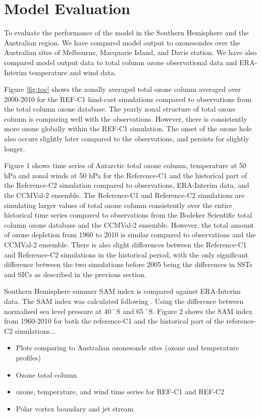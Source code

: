 \section{Model Evaluation}
To evaluate the performance of the model in the Southern Hemisphere and the Australian region. We have compared model output to ozonesondes over the Australian sites of Melbourne, Macquarie Island, and Davis station. We have also compared model output data to total column ozone observational data and ERA-Interim temperature and wind data. 

Figure \ref{fig:toc} shows the zonally averaged total ozone column averaged over 2000-2010 for the REF-C1 hind-cast simulations compared to observations from the total column ozone database. The yearly zonal structure of total ozone column is comparing well with the observations. However, there is consistently more ozone globally within the REF-C1 simulation. The onset of the ozone hole also occurs slightly later compared to the observations, and persists for slightly longer.

Figure 1 shows time series of Antarctic total ozone column, temperature at 50 hPa and zonal winds at 50 hPa for the Reference-C1 and the historical part of the Reference-C2 simulation compared to observations, ERA-Interim data, and the CCMVal-2 ensemble. The Reference-C1 and Reference-C2 simulations are simulating larger values of total ozone column consistently over the entire historical time series compared to observations from the Bodeker Scientific total column ozone database and the CCMVal-2 ensemble. However, the total amount of ozone depletion from 1960 to 2010 is similar compared to observations and the CCMVal-2 ensemble. There is also slight differences between the Reference-C1 and Reference-C2 simulations in the historical period, with the only significant difference between the two simulations before 2005 being the differences in SSTs and SICs as described in the previous section.

Southern Hemisphere summer SAM index is compared against ERA-Interim data. The SAM index was calculated following \cite{DaoyiGong:2007vm}. Using the difference between normalised sea level pressure at 40˚S and 65˚S. Figure 2 shows the SAM index from 1960-2010 for both the reference-C1 and the historical part of the reference-C2 simulations...

\begin{itemize}
\item Plots comparing to Australian ozonesonde sites (ozone and temperature profiles)
\item Ozone total column
\item ozone, temperature, and wind time series for REF-C1 and REF-C2
\item Polar vortex boundary and jet stream
\end{itemize}